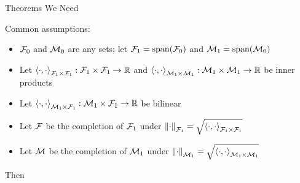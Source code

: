 \documentclass[10pt,compress,xcolor={usenames,dvipsnames},aspectratio=169]{beamer}
\begin{document}
\begin{frame}{Theorems We Need}

\vspace{-13ex}
Common assumptions:

\vspace{-3ex}

\begin{itemize}
    \item $\cf_0$ and $\cm_0$ are any sets; let $\cf_1 = \spann(\cf_0)$ and $\cm_1 = \spann(\cm_0)$

    \item Let $\ip[\cf_1 \times \cf_1]{\cdot}{\cdot}: \cf_1 \times \cf_1 \to \reals$ and $\ip[\cm_1 \times \cm_1]{\cdot}{\cdot}: \cm_1 \times \cm_1 \to \reals$ be inner products
    
    \item Let $\ip[\cm_1 \times \cf_1]{\cdot}{\cdot}: \cm_1 \times \cf_1 \to \reals$ be bilinear

    \item  Let $\cf$ be the completion of $\cf_1$ under $\norm[\cf_1]{\cdot}= \sqrt{\ip[\cf_1 \times \cf_1]{\cdot}{\cdot}}$
    
    \item Let $\cm$ be the completion of $\cm_1$ under $\norm[\cm_1]{\cdot}= \sqrt{\ip[\cm_1 \times \cm_1]{\cdot}{\cdot}}$
\end{itemize} 

\begin{theorem} 
Then
\end{theorem}
    
\end{frame}
\end{document}

